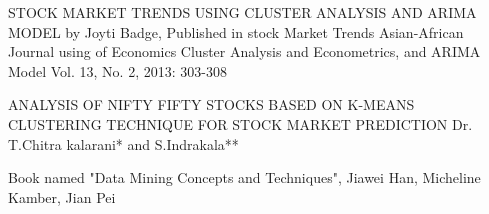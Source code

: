 \documentclass{article}
\begin{document}
\begin{thebibliography}{widestlabel}
	
STOCK MARKET TRENDS USING CLUSTER ANALYSIS AND ARIMA MODEL by Joyti Badge, Published in stock Market Trends
Asian-African Journal using of Economics Cluster Analysis
and Econometrics, and ARIMA Model Vol. 13, No. 2, 2013: 303-308

ANALYSIS OF NIFTY FIFTY STOCKS BASED ON K-MEANS CLUSTERING TECHNIQUE FOR STOCK MARKET PREDICTION Dr. T.Chitra kalarani* and S.Indrakala**

Book named "Data Mining Concepts and Techniques", Jiawei Han, Micheline Kamber, Jian Pei

\end{thebibliography}
\end{document}
